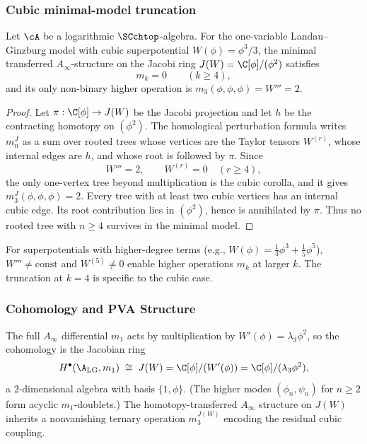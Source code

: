 \subsubsection{Cubic minimal-model truncation}

\begin{theorem}
Let\/ $\cA$ be a logarithmic\/ $\SCchtop$-algebra.
For the one-variable Landau--Ginzburg model with cubic superpotential
$W(\phi)=\phi^3/3$, the minimal transferred \(A_\infty\)-structure on
the Jacobi ring \(J(W)=\C[\phi]/(\phi^2)\) satisfies
\begin{equation}
m_k=0\qquad(k\geq4),
\end{equation}
and its only non-binary higher operation is
\(m_3(\phi,\phi,\phi)=W'''=2\).
\end{theorem}

\begin{proof}
Let \(\pi:\C[\phi]\to J(W)\) be the Jacobi projection and let \(h\)
be the contracting homotopy on \((\phi^2)\). The homological
perturbation formula writes \(m_n^J\) as a sum over rooted trees whose
vertices are the Taylor tensors \(W^{(r)}\), whose internal edges are
\(h\), and whose root is followed by \(\pi\). Since
\[
W'''=2,\qquad W^{(r)}=0\quad(r\geq4),
\]
the only one-vertex tree beyond multiplication is the cubic corolla,
and it gives \(m_3^J(\phi,\phi,\phi)=2\). Every tree with at least two
cubic vertices has an internal cubic edge. Its root contribution lies
in \((\phi^2)\), hence is annihilated by \(\pi\). Thus no rooted tree
with \(n\geq4\) survives in the minimal model.
\end{proof}

\begin{remark}
For superpotentials with higher-degree terms (e.g., $W(\phi) = \frac{1}{3}\phi^3 + \frac{1}{5}\phi^5$), $W''' \neq \text{const}$ and $W^{(5)} \neq 0$ enable higher operations $m_k$ at larger $k$. The truncation at $k=4$ is specific to the cubic case.
\end{remark}

\subsubsection{Cohomology and PVA Structure}

\begin{proposition}
The full $A_\infty$ differential $m_1$ acts by multiplication by $W'(\phi) = \lambda_3 \phi^2$, so
the cohomology is the Jacobian ring
\begin{equation}
H^\bullet(\A_{\text{LG}}, m_1) \;\cong\; J(W) = \C[\phi]/(W'(\phi)) = \C[\phi]/(\lambda_3 \phi^2),
\end{equation}
a $2$-dimensional algebra with basis $\{1, \phi\}$.
(The higher modes $(\phi_n, \psi_n)$ for $n \geq 2$ form acyclic $m_1$-doublets.)
The homotopy-transferred $A_\infty$ structure on $J(W)$ inherits a nonvanishing ternary
operation $m_3^{J(W)}$ encoding the residual cubic coupling.
\end{proposition}

